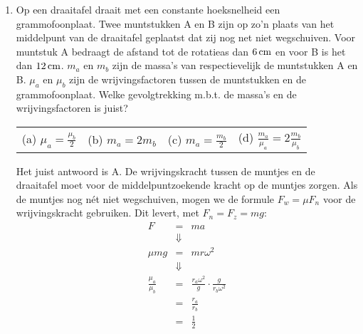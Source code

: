 \begin{enumerate}
\item Op een draaitafel draait met een constante hoeksnelheid een grammofoonplaat. Twee muntstukken A en B zijn op zo'n plaats van het middelpunt van de draaitafel geplaatst dat zij nog net niet wegschuiven. Voor muntstuk A bedraagt de afstand tot de rotatieas dan $6\rm\,cm$ en voor B is het dan $12\rm\,cm$. $m_a$ en $m_b$ zijn de massa's van respectievelijk de muntstukken A en B. $\mu_a$ en $\mu_b$ zijn de wrijvingsfactoren tussen de muntstukken en de grammofoonplaat.
\newline
Welke gevolgtrekking m.b.t. de massa's en de wrijvingsfactoren is juist?
\newline
\newline
\begin{tabularx}{\textwidth}{*4{X}}
(a) $\displaystyle\mu_a=\frac{\mu_b}{2}$ & (b) $\displaystyle m_a=2m_b$ & (c) $\displaystyle m_a=\frac{m_b}{2}$ & (d)	$\displaystyle\frac{m_a}{\mu_a}=2\frac{m_b}{\mu_b}$
\end{tabularx}
\begin{oplossing}
Het juist antwoord is A. De wrijvingskracht tussen de muntjes en de
draaitafel moet voor de middelpuntzoekende kracht op de muntjes
zorgen. Als de muntjes nog n\'et niet wegschuiven, mogen we de
formule $F_w=\mu F_n$ voor de wrij\-vings\-kracht gebruiken. Dit
levert, met $F_n=F_z=mg$:
\begin{eqnarray*}
F&=&ma\\
&\Downarrow&\\
\mu mg&=&mr\omega^2\\
&\Downarrow&\\
\frac{\mu_a}{\mu_b}&=&\frac{r_a\omega^2}{g}\cdot\frac{g}{r_b\omega^2}\\
&=&\frac{r_a}{r_b}\\
&=&\frac{1}{2}
\end{eqnarray*}
\end{oplossing}


\end{enumerate}
